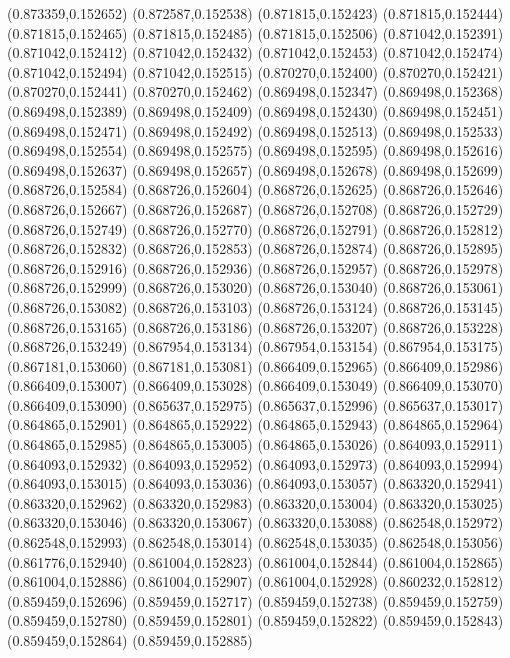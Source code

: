 (0.873359,0.152652)
(0.872587,0.152538)
(0.871815,0.152423)
(0.871815,0.152444)
(0.871815,0.152465)
(0.871815,0.152485)
(0.871815,0.152506)
(0.871042,0.152391)
(0.871042,0.152412)
(0.871042,0.152432)
(0.871042,0.152453)
(0.871042,0.152474)
(0.871042,0.152494)
(0.871042,0.152515)
(0.870270,0.152400)
(0.870270,0.152421)
(0.870270,0.152441)
(0.870270,0.152462)
(0.869498,0.152347)
(0.869498,0.152368)
(0.869498,0.152389)
(0.869498,0.152409)
(0.869498,0.152430)
(0.869498,0.152451)
(0.869498,0.152471)
(0.869498,0.152492)
(0.869498,0.152513)
(0.869498,0.152533)
(0.869498,0.152554)
(0.869498,0.152575)
(0.869498,0.152595)
(0.869498,0.152616)
(0.869498,0.152637)
(0.869498,0.152657)
(0.869498,0.152678)
(0.869498,0.152699)
(0.868726,0.152584)
(0.868726,0.152604)
(0.868726,0.152625)
(0.868726,0.152646)
(0.868726,0.152667)
(0.868726,0.152687)
(0.868726,0.152708)
(0.868726,0.152729)
(0.868726,0.152749)
(0.868726,0.152770)
(0.868726,0.152791)
(0.868726,0.152812)
(0.868726,0.152832)
(0.868726,0.152853)
(0.868726,0.152874)
(0.868726,0.152895)
(0.868726,0.152916)
(0.868726,0.152936)
(0.868726,0.152957)
(0.868726,0.152978)
(0.868726,0.152999)
(0.868726,0.153020)
(0.868726,0.153040)
(0.868726,0.153061)
(0.868726,0.153082)
(0.868726,0.153103)
(0.868726,0.153124)
(0.868726,0.153145)
(0.868726,0.153165)
(0.868726,0.153186)
(0.868726,0.153207)
(0.868726,0.153228)
(0.868726,0.153249)
(0.867954,0.153134)
(0.867954,0.153154)
(0.867954,0.153175)
(0.867181,0.153060)
(0.867181,0.153081)
(0.866409,0.152965)
(0.866409,0.152986)
(0.866409,0.153007)
(0.866409,0.153028)
(0.866409,0.153049)
(0.866409,0.153070)
(0.866409,0.153090)
(0.865637,0.152975)
(0.865637,0.152996)
(0.865637,0.153017)
(0.864865,0.152901)
(0.864865,0.152922)
(0.864865,0.152943)
(0.864865,0.152964)
(0.864865,0.152985)
(0.864865,0.153005)
(0.864865,0.153026)
(0.864093,0.152911)
(0.864093,0.152932)
(0.864093,0.152952)
(0.864093,0.152973)
(0.864093,0.152994)
(0.864093,0.153015)
(0.864093,0.153036)
(0.864093,0.153057)
(0.863320,0.152941)
(0.863320,0.152962)
(0.863320,0.152983)
(0.863320,0.153004)
(0.863320,0.153025)
(0.863320,0.153046)
(0.863320,0.153067)
(0.863320,0.153088)
(0.862548,0.152972)
(0.862548,0.152993)
(0.862548,0.153014)
(0.862548,0.153035)
(0.862548,0.153056)
(0.861776,0.152940)
(0.861004,0.152823)
(0.861004,0.152844)
(0.861004,0.152865)
(0.861004,0.152886)
(0.861004,0.152907)
(0.861004,0.152928)
(0.860232,0.152812)
(0.859459,0.152696)
(0.859459,0.152717)
(0.859459,0.152738)
(0.859459,0.152759)
(0.859459,0.152780)
(0.859459,0.152801)
(0.859459,0.152822)
(0.859459,0.152843)
(0.859459,0.152864)
(0.859459,0.152885)
